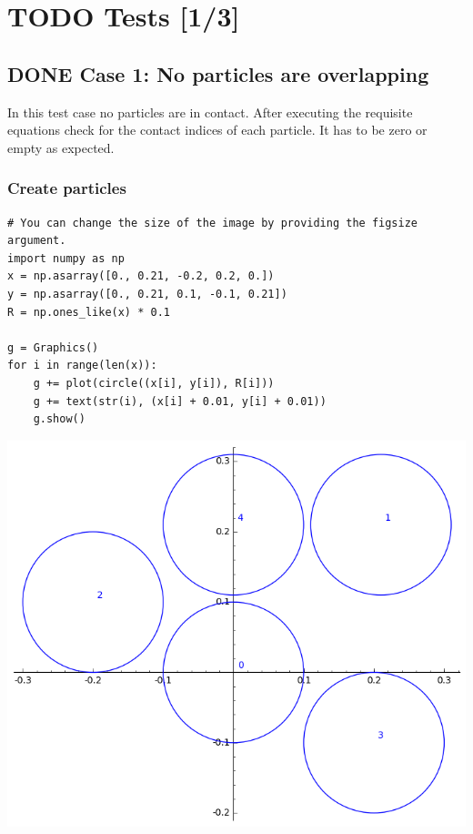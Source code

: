 \documentclass[11pt]{article}
\date{}
\title{}
\begin{document}
\section{{\bfseries\sffamily TODO} Tests [1/3]}
\label{sec:orgcb56abb}
\subsection{{\bfseries\sffamily DONE} Case 1: No particles are overlapping}
\label{sec:org37dee35}
In this test case no particles are in contact. After executing the requisite
equations check for the contact indices of each particle. It has to be zero or
empty as expected.
\subsubsection{Create particles}
\label{sec:org86f6294}
\begin{verbatim}
# You can change the size of the image by providing the figsize argument.
import numpy as np
x = np.asarray([0., 0.21, -0.2, 0.2, 0.])
y = np.asarray([0., 0.21, 0.1, -0.1, 0.21])
R = np.ones_like(x) * 0.1

g = Graphics()
for i in range(len(x)):
    g += plot(circle((x[i], y[i]), R[i]))
    g += text(str(i), (x[i] + 0.01, y[i] + 0.01))
    g.show()
\end{verbatim}

\begin{center}
\includegraphics[width=.9\linewidth]{test_figures/test_case_1.png}
\end{center}
\end{document}

